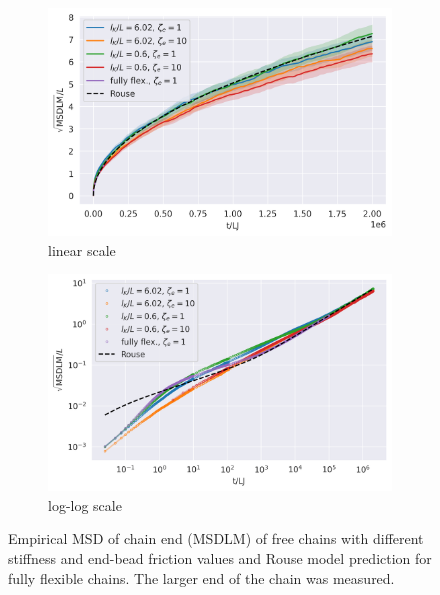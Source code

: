 \documentclass[
    paper=A4,pagesize=automedia,fontsize=12pt,
    BCOR=15mm,DIV=22,
    twoside,headinclude,footinclude=false,
    fleqn,             %
    bibliography=totocnumbered,          %
    listof=totoc,                %
    listof=flat,                 %
    cleardoublepage=empty      %
    numbers=endperiod
]{scrartcl}
\begin{document}
\begin{figure}
    \centering
    \begin{subfigure}[b]{\textwidth}
        \centering
        \includegraphics[width=\textwidth]{17+18+19+20-exp-msd.png}
        \caption{linear scale}
        \label{fig:msd_free-normal}
    \end{subfigure}
    \begin{subfigure}[b]{\textwidth}
        \centering
        \includegraphics[width=\textwidth]{17+18+19+20-exp-msd-log.png}
        \caption{log-log scale}
        \label{fig:msd_free-log}
    \end{subfigure}
    \caption{
        Empirical MSD of chain end (MSDLM) of free chains
        with different stiffness and end-bead friction values and
        Rouse model prediction for fully flexible chains.
        The larger end of the chain was measured.
    }
    \label{fig:msd_free}
\end{figure}
\end{document}
